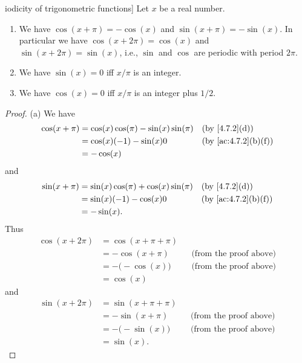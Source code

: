 \begin{thm}iodicity of trigonometric functions]\label{4.7.5}
  Let \(x\) be a real number.
  \begin{enumerate}
    \item We have \(\cos(x + \pi) = -\cos(x)\) and \(\sin(x + \pi) = -\sin(x)\).
          In particular we have \(\cos(x + 2\pi) = \cos(x)\) and \(\sin(x + 2\pi) = \sin(x)\), i.e., \(\sin\) and \(\cos\) are periodic with period \(2\pi\).
    \item We have \(\sin(x) = 0\) iff \(x / \pi\) is an integer.
    \item We have \(\cos(x) = 0\) iff \(x / \pi\) is an integer plus \(1 / 2\).
  \end{enumerate}
\end{thm}

\begin{proof}{(a)}
  We have
  \begin{align*}
    \cos(x + \pi) & = \cos(x) \cos(\pi) - \sin(x) \sin(\pi) &  & \text{(by \cref{4.7.2}(d))}       \\
                  & = \cos(x) (-1) - \sin(x) 0              &  & \text{(by \cref{ac:4.7.2}(b)(f))} \\
                  & = -\cos(x)
  \end{align*}
  and
  \begin{align*}
    \sin(x + \pi) & = \sin(x) \cos(\pi) + \cos(x) \sin(\pi) &  & \text{(by \cref{4.7.2}(d))}       \\
                  & = \sin(x) (-1) - \cos(x) 0              &  & \text{(by \cref{ac:4.7.2}(b)(f))} \\
                  & = -\sin(x).
  \end{align*}
  Thus
  \begin{align*}
    \cos(x + 2\pi) & = \cos(x + \pi + \pi)                                    \\
                   & = -\cos(x + \pi)      &  & \text{(from the proof above)} \\
                   & = -\big(-\cos(x)\big) &  & \text{(from the proof above)} \\
                   & = \cos(x)
  \end{align*}
  and
  \begin{align*}
    \sin(x + 2\pi) & = \sin(x + \pi + \pi)                                    \\
                   & = -\sin(x + \pi)      &  & \text{(from the proof above)} \\
                   & = -\big(-\sin(x)\big) &  & \text{(from the proof above)} \\
                   & = \sin(x).
  \end{align*}
\end{proof}

